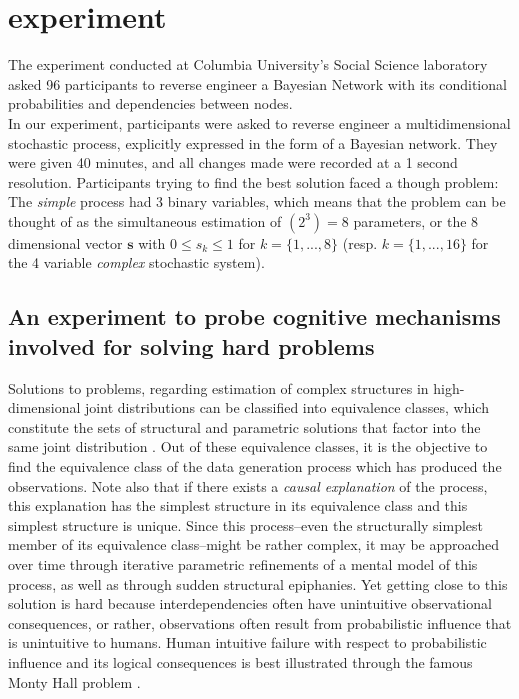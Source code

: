 \section{experiment}
The experiment conducted at Columbia University's Social Science laboratory asked 96 participants to reverse engineer a Bayesian Network with its conditional probabilities and dependencies between nodes.\\

In our experiment, participants were asked to reverse engineer a multidimensional stochastic process, explicitly expressed in the form of a Bayesian network. They were given 40 minutes, and all changes made were recorded at a 1 second resolution. Participants trying to find the best solution faced a though problem: The {\it simple} process had 3 binary variables, which means that the problem can be thought of as the simultaneous estimation of $(2^3) = 8$ parameters, or the 8 dimensional vector $\mathbf{s}$ with $0 \leqslant s_k  \leqslant 1$ for $k = \{1,...,8\}$ (resp. $k = \{1,..., 16\}$ for the 4 variable {\it complex} stochastic system).\\



\subsection{An experiment to probe cognitive mechanisms involved for solving hard problems}


Solutions to problems, regarding estimation of complex structures in high-dimensional joint distributions can be classified into equivalence classes, which constitute the sets of structural and parametric solutions that factor into the same joint distribution \cite{pearl2009causality, Pearl2009CMR, Koller2009PGM}.  Out of these equivalence classes, it is the objective to find the equivalence class of the data generation process which has produced the observations. Note also that if there exists a {\it causal explanation} of the process, this explanation has the simplest structure in its equivalence class \cite{Koller2009PGM} and this simplest structure is unique.  Since this process--even the structurally simplest member of its equivalence class--might be rather complex, it may be approached over time through iterative parametric refinements of a mental model of this process, as well as through sudden structural epiphanies. Yet getting close to this solution is hard because interdependencies often have unintuitive observational consequences, or rather, observations often result from  probabilistic influence that is unintuitive to humans. Human intuitive failure with respect to probabilistic influence and its logical consequences is best illustrated through the famous Monty Hall problem \cite{Blackburn08Phil, Honderich05Phil, Upton14Statistics, Colman08Psych}. \\

